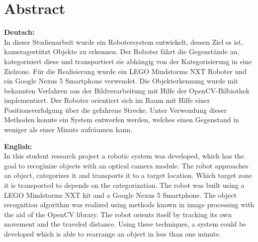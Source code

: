 \chapter*{Abstract}

\textbf{Deutsch:}\\
In dieser Studienarbeit wurde ein Robotersystem entwickelt, dessen Ziel es ist, kameragestützt Objekte zu erkennen. Der Roboter fährt die Gegenstände an, kategorisiert diese und transportiert sie abhängig von der Kategorisierung in eine Zielzone. Für die Realisierung wurde ein LEGO Mindstorms NXT Roboter und ein Google Nexus 5 Smartphone verwendet. Die Objekterkennung wurde mit bekannten Verfahren aus der Bildverarbeitung mit Hilfe der OpenCV-Bilbiothek implementiert. Der Roboter orientiert sich im Raum mit Hilfe einer Positionsverfolgung über die gefahrene Strecke. Unter Verwendung dieser Methoden konnte ein System entworfen werden, welches einen Gegenstand in weniger als einer Minute aufräumen kann.

\vspace{1cm}

\textbf{English:}\\
In this student research project a robotic system was developed, which has the goal to recoginize objects with an optical camera module. The robot approaches an object, categorizes it and transports it to a target location. Which target zone it is transported to depends on the categorization. The robot was built using a LEGO Mindstorms NXT kit and a Google Nexus 5 Smartphone. The object recognition algorithm was realized using methods known in image processing with the aid of the OpenCV library. The robot orients itself by tracking its own movement and the traveled distance. Using these techniques, a system could be developed which is able to rearrange an object in less than one minute.